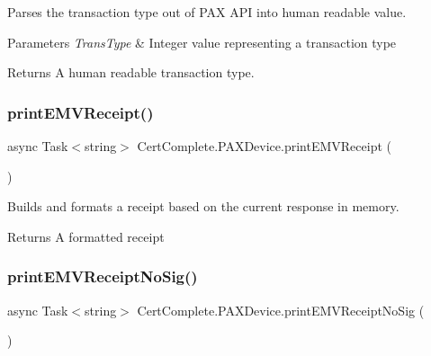 Parses the transaction type out of P\+AX A\+PI into human readable value. 


\begin{DoxyParams}{Parameters}
{\em Trans\+Type} & Integer value representing a transaction type\\
\hline
\end{DoxyParams}
\begin{DoxyReturn}{Returns}
A human readable transaction type.
\end{DoxyReturn}
\mbox{\label{class_cert_complete_1_1_p_a_x_device_a3015c00ac78960de4f0bf54d45c76879}} 
\subsubsection{\texorpdfstring{print\+E\+M\+V\+Receipt()}{printEMVReceipt()}}
{\footnotesize\ttfamily async Task$<$string$>$ Cert\+Complete.\+P\+A\+X\+Device.\+print\+E\+M\+V\+Receipt (\begin{DoxyParamCaption}{ }\end{DoxyParamCaption})\hspace{0.3cm}{\ttfamily [inline]}}



Builds and formats a receipt based on the current response in memory. 

\begin{DoxyReturn}{Returns}
A formatted receipt
\end{DoxyReturn}
\mbox{\label{class_cert_complete_1_1_p_a_x_device_adc3aa4a5692d3b8dd61a15668b516546}} 
\subsubsection{\texorpdfstring{print\+E\+M\+V\+Receipt\+No\+Sig()}{printEMVReceiptNoSig()}}
{\footnotesize\ttfamily async Task$<$string$>$ Cert\+Complete.\+P\+A\+X\+Device.\+print\+E\+M\+V\+Receipt\+No\+Sig (\begin{DoxyParamCaption}{ }\end{DoxyParamCaption})\hspace{0.3cm}{\ttfamily [inline]}}



